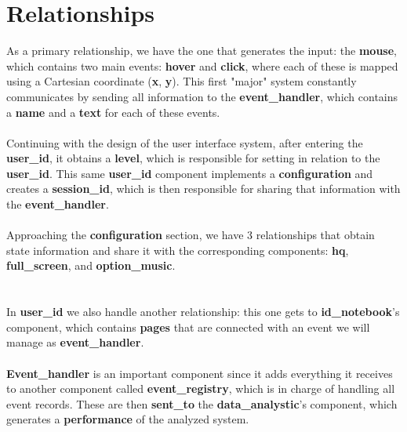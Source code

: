 \documentclass{article}
\begin{document}
\section*{Relationships}

\par
As a primary relationship, we have the one that generates the input: the \textbf{\textbf{mouse}}, 
which contains two main events: \textbf{\textbf{hover}} and \textbf{\textbf{click}}, where each 
of these is mapped using a Cartesian coordinate (\textbf{\textbf{x}}, \textbf{\textbf{y}}). This 
first "major" system constantly communicates by sending all information 
to the \textbf{\textbf{event\_handler}}, which contains a \textbf{\textbf{name}} and 
a \textbf{\textbf{text}} for each of these events.
\\
\\
Continuing with the design of the user interface system, after entering the
 \textbf{\textbf{user\_id}}, it obtains a \textbf{\textbf{level}}, which is responsible for 
 setting in relation to the \textbf{\textbf{user\_id}}. This same \textbf{\textbf{user\_id}} 
 component implements a \textbf{\textbf{configuration}} and creates a \textbf{\textbf{session\_id}},
  which is then responsible for sharing that information with the \textbf{\textbf{event\_handler}}.
  \\
  \\
Approaching the \textbf{\textbf{configuration}} section, we have 3 relationships that obtain state
 information and share it with the corresponding components: \textbf{\textbf{hq}},
  \textbf{\textbf{full\_screen}}, and \textbf{\textbf{option\_music}}. 
  \\
 \\
 \\
In \textbf{\textbf{user\_id}} we also handle another relationship: this one gets to 
\textbf{\textbf{id\_notebook}}’s component, which contains \textbf{\textbf{pages}} 
that are connected with an event we will manage as \textbf{\textbf{event\_handler}}.
\\
\\
\textbf{\textbf{Event\_handler}} is an important component since it adds everything it receives 
to another component called \textbf{\textbf{event\_registry}}, which is in charge of handling all 
event records. These are then \textbf{\textbf{sent\_to}} the \textbf{\textbf{data\_analystic}}’s 
component, which generates a \textbf{\textbf{performance}} of the analyzed system.
\end{document}
